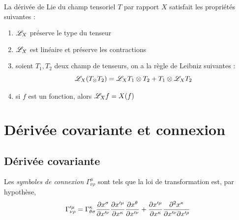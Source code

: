 \documentclass[a4paper,11pt]{report}
\begin{document}
            \begin{prop}
            \begin{leftbar}
                La dérivée de Lie du champ tensoriel $T$ par rapport $X$ satisfait les propriétés suivantes :
                \begin{enumerate}[label = \textit{\roman*)}]
                    \item $\mathscr{L}_X$ préserve le type du tenseur
                    \item $\mathscr{L}_X$ est linéaire et préserve les contractions
                    \item soient $T_1,T_2$ deux champ de tenseurs, on a la règle de Leibniz suivantes :
                    \begin{equation}
                        \mathscr{L}_X(T_\otimes T_2) = \mathscr{L}_X T_1\otimes T_2+T_1\otimes \mathscr{L}_X T_2
                    \end{equation}
                    \item si $f$ est un fonction, alors 
                    $\mathscr{L}_Xf = X(f)$
                \end{enumerate}
            \end{leftbar}
            \end{prop}
            
            \comp
            
        
        \section{Dérivée covariante et connexion}
        
            \subsection{Dérivée covariante}
        
                \begin{defn}
                    Les \textit{symboles de connexion} $\Gamma^\mu_{\nu\rho}$ sont tels que la loi de transformation est, par hypothèse,
                    \begin{equation}
                        \Gamma'^\mu_{\nu\rho} = \Gamma^\kappa_{\theta\sigma}\frac{\partial x^\sigma}{\partial x'^\nu} \frac{\partial x'^\mu}{\partial x^\kappa}\frac{\partial x^\theta}{\partial x'^\nu} +  \frac{\partial x'^\mu}{\partial x^\kappa}\frac{\partial^2 x^\kappa}{\partial x'^\nu\partial x'^\rho}
                    \end{equation}
                \end{defn}
                
\end{document}
